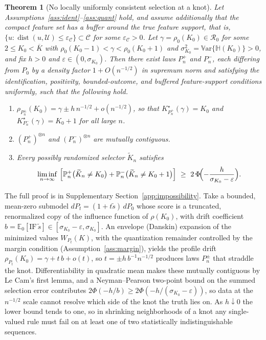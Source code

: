 \documentclass[11pt]{article}
\newtheorem{theorem}{Theorem}%
\newcommand{\E}{\mathbb E}
\newcommand{\Pp}{\mathbb P}
\newcommand{\Var}{\mathbb V\mathrm{ar}}
\newcommand{\dist}{\operatorname{dist}}
\newcommand{\calC}{\mathcal C}
\newcommand{\calU}{\mathcal U}
\newcommand{\eps}{\varepsilon}
\begin{document}
\begin{theorem}[No locally uniformly consistent selection at a knot]\label{thm:impossibility}
Let Assumptions~\ref{ass:ident}--\ref{ass:quant} hold, and assume additionally that the compact feature set has a buffer around the true feature support, that is, $\{u:\dist(u,\calU)\le\eps_{\calC}\}\subset\calC$ for some $\eps_{\calC}>0$.  Let $\gamma=\rho_0(K_0)\in\mathcal R_0$ for some $2\le K_0<\overline K$ with $\rho_0(K_0-1)<\gamma<\rho_0(K_0+1)$ and $\sigma_{K_0}^2=\Var\{\mathbb H(K_0)\}>0$, and fix $h>0$ and $\eps\in(0,\sigma_{K_0})$.  Then there exist laws $P_n^{+}$ and $P_n^{-}$, each differing from $P_0$ by a density factor $1+O(n^{-1/2})$ in supremum norm and satisfying the identification, positivity, bounded-outcome, and buffered feature-support conditions uniformly, such that the following hold.
\begin{enumerate}[label=(\roman*),leftmargin=2em]
\item $\rho_{P_n^{\pm}}(K_0)=\gamma\pm h\,n^{-1/2}+o(n^{-1/2})$, so that $K^\star_{P_n^{+}}(\gamma)=K_0$ and $K^\star_{P_n^{-}}(\gamma)=K_0+1$ for all large $n$.
\item $(P_n^{+})^{\otimes n}$ and $(P_n^{-})^{\otimes n}$ are mutually contiguous.
\item Every possibly randomized selector $\widetilde K_n$ satisfies
\begin{equation*}
\liminf_{n\to\infty}\ \Bigl[\Pp^{+}_n\bigl(\widetilde K_n\ne K_0\bigr)+\Pp^{-}_n\bigl(\widetilde K_n\ne K_0+1\bigr)\Bigr]
\ \ge\ 2\,\Phi\!\Bigl(-\frac{h}{\sigma_{K_0}-\eps}\Bigr).
\end{equation*}
\end{enumerate}
\end{theorem}
The full proof is in Supplementary Section~\ref{app:impossibility}. Take a bounded, mean-zero submodel $dP_t=(1+t\tilde s)\,dP_0$ whose score is a truncated, renormalized copy of the influence function of $\rho(K_0)$, with drift coefficient $b=\E_0[\mathrm{IF}\,\tilde s]\in[\sigma_{K_0}-\eps,\sigma_{K_0}]$. An envelope (Danskin) expansion of the minimized values $W_{P_t}(K)$, with the quantization remainder controlled by the margin condition (Assumption~\ref{ass:margin}), yields the profile drift $\rho_{P_t}(K_0)=\gamma+t\,b+o(t)$, so $t=\pm h\,b^{-1}n^{-1/2}$ produces laws $P_n^{\pm}$ that straddle the knot. Differentiability in quadratic mean makes these mutually contiguous by Le Cam's first lemma, and a Neyman--Pearson two-point bound on the summed selection error contributes $2\Phi(-h/b)\ge2\Phi(-h/(\sigma_{K_0}-\eps))$, so data at the $n^{-1/2}$ scale cannot resolve which side of the knot the truth lies on. As $h\downarrow0$ the lower bound tends to one, so in shrinking neighborhoods of a knot any single-valued rule must fail on at least one of two statistically indistinguishable sequences.
\end{document}
